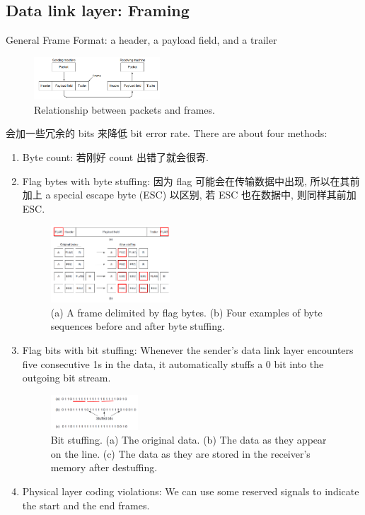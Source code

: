\subsection{Data link layer: Framing}
General Frame Format: a header, a payload field, and a trailer
\begin{figure}[!htb]
    \centering
    \includegraphics[width=0.42\textwidth]{pic/CN3/Relationship between packets and frames.}
    \caption{Relationship between packets and frames.}
\end{figure}

会加一些冗余的 bits 来降低 bit error rate. There are about four methods:
\begin{enumerate}
    \item Byte count: 若刚好 count 出错了就会很寄. 
    \item Flag bytes with byte stuffing: 因为 flag 可能会在传输数据中出现, 所以在其前加上 a special escape byte (ESC) 以区别, 若 ESC 也在数据中, 则同样其前加 ESC. 
    \begin{figure}[!htb]
        \centering
        \includegraphics[width=0.42\textwidth]{pic/CN3/Flag Byte with Byte Stuffing.png}
        \caption{(a) A frame delimited by flag bytes. (b) Four examples of byte sequences before and after byte stuffing.}
    \end{figure}
    
    \item Flag bits with bit stuffing: Whenever the sender's data link layer encounters five consecutive 1s in the data, it automatically stuffs a 0 bit into the outgoing bit stream.
    \begin{figure}[!htb]
        \centering
        \includegraphics[width=0.309\textwidth]{pic/CN3/Flag Byte with Bit Stuffing.png}
        \caption{Bit stuffing. (a) The original data. (b) The data as they appear on the line. (c) The data as they are stored in the receiver's memory after destuffing.}
    \end{figure}
    
    \item Physical layer coding violations: We can use some reserved signals to indicate the start and the end frames.
\end{enumerate}

